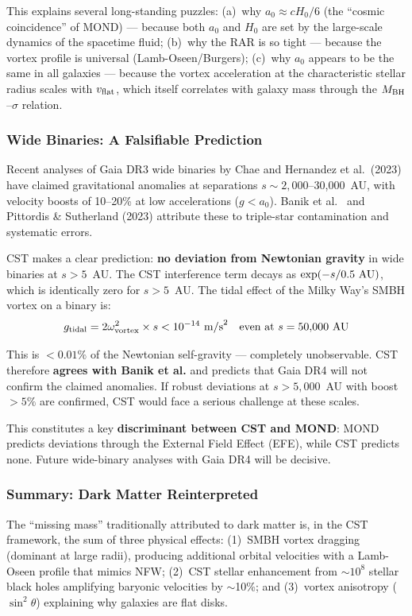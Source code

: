 \documentclass[11pt,a4paper]{article}
\begin{document}
This explains several long-standing puzzles: (a)~why $a_0 \approx cH_0/6$ (the ``cosmic coincidence'' of MOND) --- because both $a_0$ and $H_0$ are set by the large-scale dynamics of the spacetime fluid; (b)~why the RAR is so tight --- because the vortex profile is universal (Lamb-Oseen/Burgers); (c)~why $a_0$ appears to be the same in all galaxies --- because the vortex acceleration at the characteristic stellar radius scales with $v_{\rm flat}$, which itself correlates with galaxy mass through the $M_{\rm BH}$--$\sigma$ relation.

\subsubsection{Wide Binaries: A Falsifiable Prediction}

Recent analyses of Gaia DR3 wide binaries by Chae \cite{Chae2024} and Hernandez et al.\ (2023) have claimed gravitational anomalies at separations $s \sim 2{,}000$--30{,}000~AU, with velocity boosts of 10--20\% at low accelerations ($g < a_0$). Banik et al.\ \cite{Banik2024} and Pittordis \& Sutherland (2023) attribute these to triple-star contamination and systematic errors.

CST makes a clear prediction: \textbf{no deviation from Newtonian gravity} in wide binaries at $s > 5$~AU. The CST interference term decays as $\exp(-s/0.5~{\rm AU})$, which is identically zero for $s > 5$~AU. The tidal effect of the Milky Way's SMBH vortex on a binary is:
\[g_{\rm tidal} = 2\omega_{\rm vortex}^2 \times s < 10^{-14}~{\rm m/s}^2 \quad \text{even at } s = 50{,}000~{\rm AU}\]

This is $< 0.01\%$ of the Newtonian self-gravity --- completely unobservable. CST therefore \textbf{agrees with Banik et al.} and predicts that Gaia DR4 will not confirm the claimed anomalies. If robust deviations at $s > 5{,}000$~AU with boost $> 5\%$ are confirmed, CST would face a serious challenge at these scales.

This constitutes a key \textbf{discriminant between CST and MOND}: MOND predicts deviations through the External Field Effect (EFE), while CST predicts none. Future wide-binary analyses with Gaia DR4 will be decisive.

\subsubsection{Summary: Dark Matter Reinterpreted}

The ``missing mass'' traditionally attributed to dark matter is, in the CST framework, the sum of three physical effects: (1)~SMBH vortex dragging (dominant at large radii), producing additional orbital velocities with a Lamb-Oseen profile that mimics NFW; (2)~CST stellar enhancement from $\sim 10^8$ stellar black holes amplifying baryonic velocities by $\sim$10\%; and (3)~vortex anisotropy ($\sin^2\theta$) explaining why galaxies are flat disks.
\end{document}
